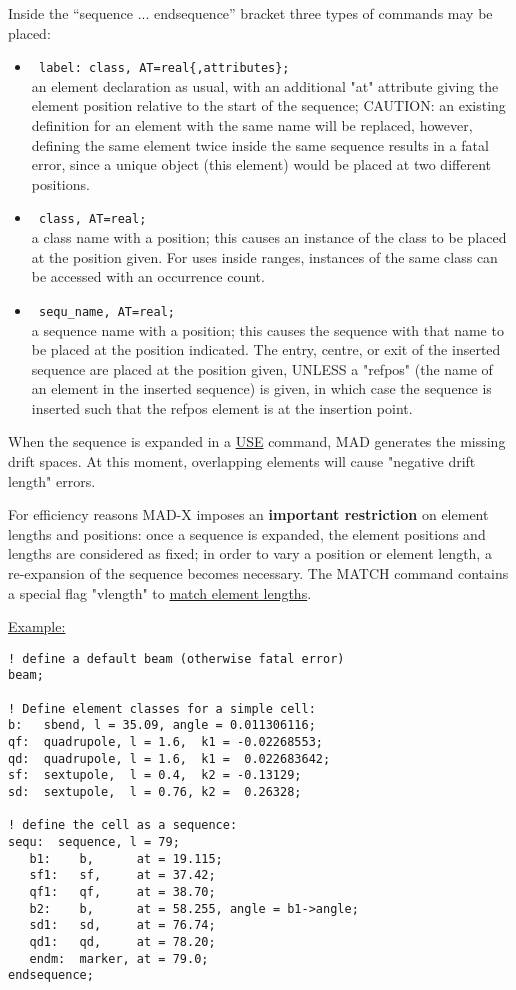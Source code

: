 Inside the ``sequence ... endsequence'' bracket three types of commands may
be placed:  
\begin{itemize}
   \item \verb( label: class, AT=real{,attributes}; (\\
     an element declaration as usual, with an additional "at"
     attribute giving the element position relative to the start of the
     sequence; CAUTION: an existing definition for an element with the
     same name will be replaced, however, defining the same element
     twice inside the same sequence results in a fatal error, since a
     unique object (this element) would be placed at two different
     positions. 
   \item \verb( class, AT=real; (\\
     a class name with a position; this causes an instance of the
     class to be placed at the position given. For uses inside ranges,
     instances of the same class can be accessed with an occurrence
     count. 
   \item \verb( sequ_name, AT=real; (\\
     a sequence name with a position; this causes the sequence with
     that name to be placed at the position indicated. The entry,
     centre, or exit of the inserted sequence are placed at the position
     given, UNLESS a "refpos" (the name of an element in the inserted
     sequence) is given, in which case the sequence is inserted such
     that the refpos element is at the insertion point. 
\end{itemize} 

When the sequence is expanded in a
\href{../control/general.html#use}{USE} command, MAD generates the
missing drift spaces. At this moment, overlapping elements will cause
"negative drift length" errors.  

For efficiency reasons MAD-X imposes an \textbf{important restriction}
on element lengths and positions: once a sequence is expanded, the
element positions and lengths are considered as fixed; in order to vary
a position or element length, a re-expansion of the sequence becomes
necessary. The MATCH command contains a special flag "vlength" to
\href{../match/match.html}{match element lengths}.  

\href{example}{Example:}
\begin{verbatim}
! define a default beam (otherwise fatal error)
beam;

! Define element classes for a simple cell:
b:   sbend, l = 35.09, angle = 0.011306116;
qf:  quadrupole, l = 1.6,  k1 = -0.02268553;
qd:  quadrupole, l = 1.6,  k1 =  0.022683642;
sf:  sextupole,  l = 0.4,  k2 = -0.13129;
sd:  sextupole,  l = 0.76, k2 =  0.26328;

! define the cell as a sequence:
sequ:  sequence, l = 79;
   b1:    b,      at = 19.115;
   sf1:   sf,     at = 37.42;
   qf1:   qf,     at = 38.70;
   b2:    b,      at = 58.255, angle = b1->angle;
   sd1:   sd,     at = 76.74;
   qd1:   qd,     at = 78.20;
   endm:  marker, at = 79.0;
endsequence;
\end{verbatim}

